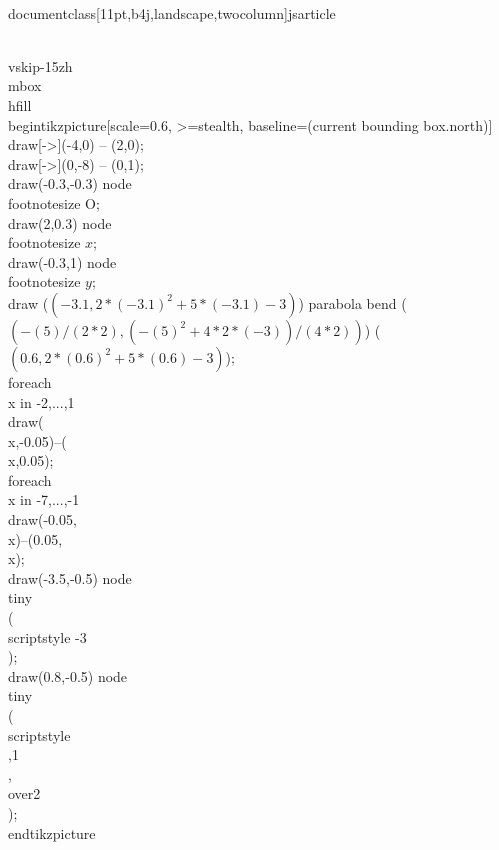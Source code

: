 \\documentclass[11pt,b4j,landscape,twocolumn]{jsarticle}
\begin{document}
\\vskip-15zh
\\mbox{}\\hfill
\\begin{tikzpicture}[scale=0.6, >=stealth, baseline=(current bounding box.north)]
\\draw[->](-4,0) -- (2,0);
\\draw[->](0,-8) -- (0,1);
\\draw(-0.3,-0.3) node {\\footnotesize O};
\\draw(2,0.3) node {\\footnotesize $x$};
\\draw(-0.3,1) node {\\footnotesize $y$};
\\draw ($ (-3.1,{2*(-3.1)^2+5*(-3.1)-3}) $) parabola bend ($ ({-(5)/(2*2)},{(-(5)^2+4*2*(-3))/(4*2)}) $) ($ (0.6,{2*(0.6)^2+5*(0.6)-3}) $);
\\foreach \\x in {-2,...,1}{\\draw(\\x,-0.05)--(\\x,0.05);}
\\foreach \\x in {-7,...,-1}{\\draw(-0.05,\\x)--(0.05,\\x);}
\\draw(-3.5,-0.5) node {\\tiny \\( \\scriptstyle -3 \\)};
\\draw(0.8,-0.5) node {\\tiny \\( \\scriptstyle {\\,1\\,\\over2} \\)};
\\end{tikzpicture}
\end{document}

